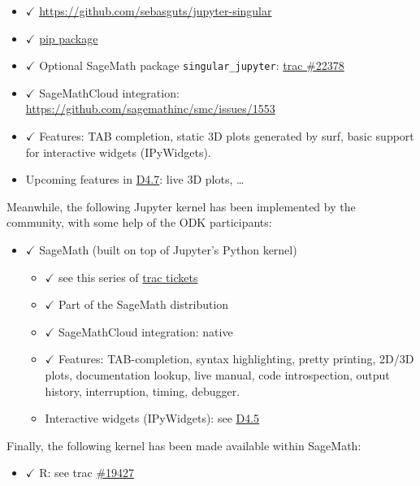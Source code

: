 \begin{itemize}
  \begin{itemize}
  \tightlist
  \item
    \(\checkmark\) \url{https://github.com/sebasguts/jupyter-singular}
  \item
    \(\checkmark\)
    \href{https://pypi.python.org/pypi/jupyter-kernel-singular/}{pip
    package}
  \item
    \(\checkmark\) Optional SageMath package \texttt{singular\_jupyter}:
    \href{https://trac.sagemath.org/ticket/22378}{trac \#22378}
  \item
    \(\checkmark\) SageMathCloud integration:
    \url{https://github.com/sagemathinc/smc/issues/1553}
  \item
    \(\checkmark\) Features: TAB completion, static 3D plots generated
    by surf, basic support for interactive widgets (IPyWidgets).
  \item
    Upcoming features in
    \href{https://github.com/OpenDreamKit/OpenDreamKit/issues/96}{D4.7}:
    live 3D plots, \ldots{}
  \end{itemize}
\end{itemize}

Meanwhile, the following Jupyter kernel has been implemented by the
community, with some help of the ODK participants:

\begin{itemize}
\tightlist
\item
  \(\checkmark\) SageMath (built on top of Jupyter's Python kernel)

  \begin{itemize}
  \tightlist
  \item
    \(\checkmark\) see this series of
    \href{https://trac.sagemath.org/query?status=closed\&summary=~Jupyter\&col=id\&col=summary\&col=status\&col=type\&col=priority\&col=milestone\&col=component\&order=priority}{trac
    tickets}
  \item
    \(\checkmark\) Part of the SageMath distribution
  \item
    \(\checkmark\) SageMathCloud integration: native
  \item
    \(\checkmark\) Features: TAB-completion, syntax highlighting, pretty
    printing, 2D/3D plots, documentation lookup, live manual, code
    introspection, output history, interruption, timing, debugger.
  \item
    Interactive widgets (IPyWidgets): see
    \href{https://github.com/OpenDreamKit/OpenDreamKit/issues/94}{D4.5}
  \end{itemize}
\end{itemize}

Finally, the following kernel has been made available within SageMath:

\begin{itemize}
\tightlist
\item
  \(\checkmark\) R: see trac
  \href{https://trac.sagemath.org/ticket/19427}{\#19427}
\end{itemize}
